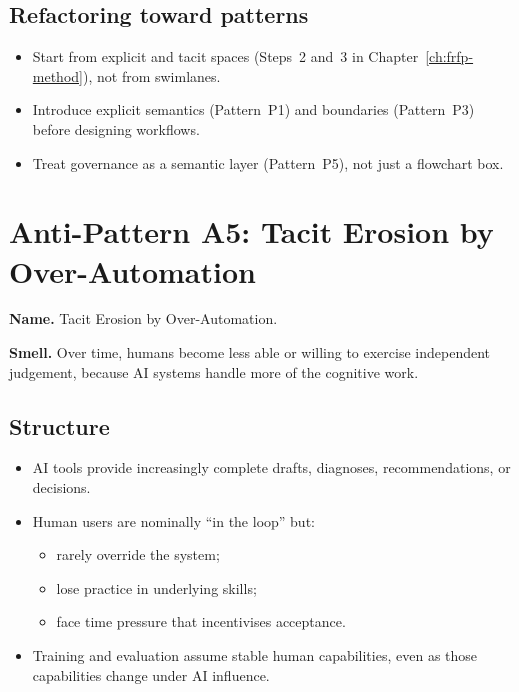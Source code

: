 \subsection*{Refactoring toward patterns}

\begin{itemize}
  \item Start from explicit and tacit spaces (Steps~2 and~3 in
        Chapter~\ref{ch:frfp-method}), not from swimlanes.
  \item Introduce explicit semantics (Pattern~P1) and boundaries
        (Pattern~P3) before designing workflows.
  \item Treat governance as a semantic layer (Pattern~P5), not just a
        flowchart box.
\end{itemize}

\section{Anti-Pattern A5: Tacit Erosion by Over-Automation}
\label{antipattern:a5}

\textbf{Name.} Tacit Erosion by Over-Automation.

\textbf{Smell.} Over time, humans become less able or willing to
exercise independent judgement, because AI systems handle more of the
cognitive work.

\subsection*{Structure}

\begin{itemize}
  \item AI tools provide increasingly complete drafts, diagnoses,
        recommendations, or decisions.
  \item Human users are nominally ``in the loop'' but:
        \begin{itemize}
          \item rarely override the system;
          \item lose practice in underlying skills;
          \item face time pressure that incentivises acceptance.
        \end{itemize}
  \item Training and evaluation assume stable human capabilities, even
        as those capabilities change under AI influence.
\end{itemize}

